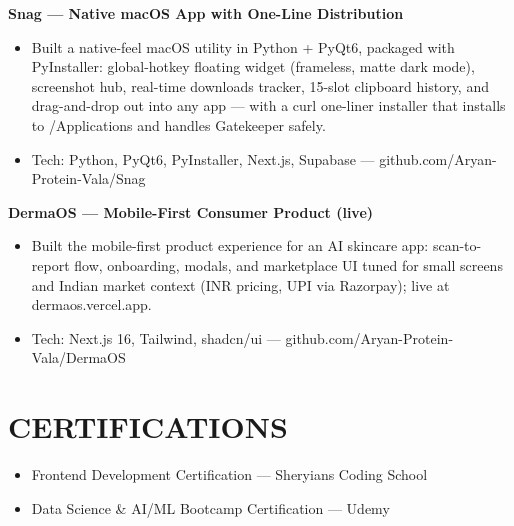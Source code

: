 \documentclass[9pt]{article}
\begin{document}
\textbf{Snag  ---  Native macOS App with One-Line Distribution}
\vspace{1pt}
\begin{itemize}[leftmargin=11pt,itemsep=0pt,topsep=1pt,parsep=0pt]
\item Built a native-feel macOS utility in Python + PyQt6, packaged with PyInstaller: global-hotkey floating widget (frameless, matte dark mode), screenshot hub, real-time downloads tracker, 15-slot clipboard history, and drag-and-drop out into any app  ---  with a curl one-liner installer that installs to /Applications and handles Gatekeeper safely.
\item Tech: Python, PyQt6, PyInstaller, Next.js, Supabase  ---  github.com/Aryan-Protein-Vala/Snag
\end{itemize}
\textbf{DermaOS  ---  Mobile-First Consumer Product (live)}
\vspace{1pt}
\begin{itemize}[leftmargin=11pt,itemsep=0pt,topsep=1pt,parsep=0pt]
\item Built the mobile-first product experience for an AI skincare app: scan-to-report flow, onboarding, modals, and marketplace UI tuned for small screens and Indian market context (INR pricing, UPI via Razorpay); live at dermaos.vercel.app.
\item Tech: Next.js 16, Tailwind, shadcn/ui  ---  github.com/Aryan-Protein-Vala/DermaOS
\end{itemize}
\section*{CERTIFICATIONS}
\begin{itemize}[leftmargin=11pt,itemsep=0pt,topsep=1pt,parsep=0pt]
\item Frontend Development Certification  ---  Sheryians Coding School
\item Data Science \& AI/ML Bootcamp Certification  ---  Udemy
\end{itemize}
\end{document}
